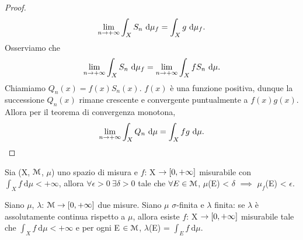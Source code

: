\documentclass[Completo.tex]{subfiles}
\begin{document}
\begin{proof}
	\begin{equation*}
	\lim_{n \rightarrow +\infty} \int_X S_n \ \mathrm{d}\mu_f = \int_X g \ \mathrm{d}\mu_f.
	\end{equation*}	
	Osserviamo che
	\begin{equation*}
	\lim_{n \ra +\infty} \int_X S_n \ \mathrm{d}\mu_f = \lim_{n \ra +\infty} \int_X f S_n \ \mathrm{d}\mu.
	\end{equation*}
	Chiamiamo $Q_n(x) = f(x)S_n(x)$. $f(x)$ è una funzione positiva, dunque la successione $Q_n(x)$ rimane crescente e convergente puntualmente a $f(x)g(x)$. Allora per il teorema di convergenza monotona,
	\begin{equation*}
	\lim_{n \rightarrow +\infty} \int_X Q_n \ \mathrm{d}\mu = \int_X fg \ \mathrm{d}\mu.
	\end{equation*}
	\end{proof}
\begin{Cor}
	Sia (X, $\eu[M]$, $\mu$) uno spazio di misura e $f$: X $\rightarrow [0, +\infty]$ misurabile con $\int_X f \ \mathrm{d}\mu < +\infty$, allora $\forall \epsilon > 0 \ \exists \delta > 0$ tale che $\forall E \in \eu[M]$, $\mu$(E) < $\delta$ $\implies$ $\mu_f$(E) < $\epsilon$.
\end{Cor}
\begin{Th}
	Siano $\mu$, $\lambda$: $\eu[M] \ra [0, +\infty]$ due misure. Siano $\mu$ $\sigma$-finita e $\lambda$ finita: se $\lambda$ è assolutamente continua rispetto a $\mu$, allora esiste $f$: X $\rightarrow [0, +\infty]$ misurabile tale che $\int_X f \ \mathrm{d}\mu < +\infty$ e per ogni E $\in \eu[M]$, $\lambda$(E) = $\int_E f \ \mathrm{d}\mu$.
\end{Th}
\end{document}
